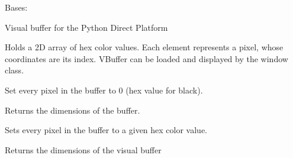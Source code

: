\documentclass[letterpaper,10pt,english,openany,oneside]{sphinxmanual}
\begin{document}
\begin{fulllineitems}

\pysigstartsignatures
{}
\pysigstopsignatures
\sphinxAtStartPar
Bases: 

\sphinxAtStartPar
Visual buffer for the Python Direct Platform

\sphinxAtStartPar
Holds a 2D array of hex color values. Each element represents a pixel,
whose coordinates are its index. VBuffer can be loaded and displayed by
the window class.


\begin{fulllineitems}

\pysigstartsignatures
{}
\pysigstopsignatures
\sphinxAtStartPar
Set every pixel in the buffer to 0 (hex value for black).

\end{fulllineitems}



\begin{fulllineitems}

\pysigstartsignatures
{}
\pysigstopsignatures
\sphinxAtStartPar
Returns the dimensions of the buffer.

\end{fulllineitems}



\begin{fulllineitems}

\pysigstartsignatures
{}
\pysigstopsignatures
\sphinxAtStartPar
Sets every pixel in the buffer to a given hex color value.

\end{fulllineitems}



\begin{fulllineitems}

\pysigstartsignatures
{}
\pysigstopsignatures
\sphinxAtStartPar
Returns the dimensions of the visual buffer


\end{fulllineitems}
\end{fulllineitems}
\end{document}
